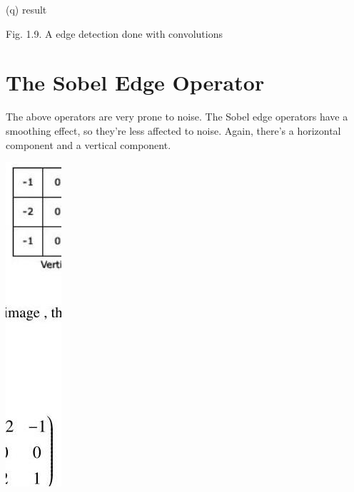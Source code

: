 \documentclass[10pt]{article}
\begin{document}
(q) result

Fig. 1.9. A edge detection done with convolutions

\section{The Sobel Edge Operator}
The above operators are very prone to noise. The Sobel edge operators have a smoothing effect, so they're less affected to noise. Again, there's a horizontal component and a vertical component.

\includegraphics[max width=\textwidth]{2022_01_06_b5ce182ed1bd5f482e5bg-17}
\end{document}
